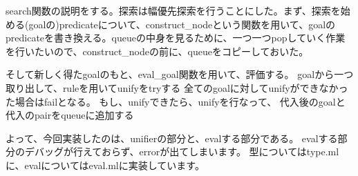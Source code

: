 \documentclass[uplatex,12pt]{jsarticle}
\begin{document}
search関数の説明をする。探索は幅優先探索を行うことにした。まず、探索を始める(goalの)predicateについて、construct\_nodeという関数を用いて、goalのpredicateを書き換える。queueの中身を見るために、一つ一つpopしていく作業を行いたいので、construct\_nodeの前に、queueをコピーしておいた。

そして新しく得たgoalのもと、eval\_goal関数を用いて、評価する。
goalから一つ取り出して、ruleを用いてunifyをtryする
全てのgoalに対してunifyができなかった場合はfailとなる。
もし、unifyできたら、unifyを行なって、
代入後のgoalと代入のpairをqueueに追加する

よって、今回実装したのは、unifierの部分と、evalする部分である。
evalする部分のデバッグが行えておらず、errorが出てしまいます。
型についてはtype.mlに、evalについてはeval.mlに実装しています。
\end{document}
